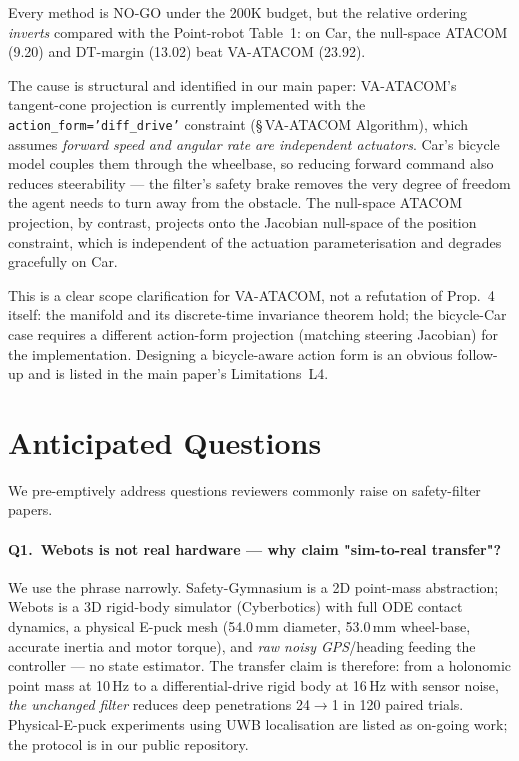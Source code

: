\documentclass[letterpaper]{article}
\begin{document}
Every method is NO-GO under the 200K budget, but the relative ordering \emph{inverts} compared with the Point-robot Table~1: on Car, the null-space ATACOM (9.20) and DT-margin (13.02) beat VA-ATACOM (23.92).

The cause is structural and identified in our main paper: VA-ATACOM's tangent-cone projection is currently implemented with the \texttt{action\_form='diff\_drive'} constraint (\S\,VA-ATACOM Algorithm), which assumes \emph{forward speed and angular rate are independent actuators}. Car's bicycle model couples them through the wheelbase, so reducing forward command also reduces steerability --- the filter's safety brake removes the very degree of freedom the agent needs to turn away from the obstacle. The null-space ATACOM projection, by contrast, projects onto the Jacobian null-space of the position constraint, which is independent of the actuation parameterisation and degrades gracefully on Car.

This is a clear scope clarification for VA-ATACOM, not a refutation of Prop.~4 itself: the manifold and its discrete-time invariance theorem hold; the bicycle-Car case requires a different action-form projection (matching steering Jacobian) for the implementation. Designing a bicycle-aware action form is an obvious follow-up and is listed in the main paper's Limitations~L4.

\section{Anticipated Questions}
\label{sec:faq}

We pre-emptively address questions reviewers commonly raise on safety-filter papers.

\paragraph{Q1.\ Webots is not real hardware --- why claim "sim-to-real transfer"?}
We use the phrase narrowly. Safety-Gymnasium is a 2D point-mass abstraction; Webots is a 3D rigid-body simulator (Cyberbotics) with full ODE contact dynamics, a physical E-puck mesh (54.0\,mm diameter, 53.0\,mm wheel-base, accurate inertia and motor torque), and \emph{raw noisy GPS}/heading feeding the controller --- no state estimator. The transfer claim is therefore: from a holonomic point mass at 10\,Hz to a differential-drive rigid body at 16\,Hz with sensor noise, \emph{the unchanged filter} reduces deep penetrations 24$\rightarrow$1 in 120 paired trials. Physical-E-puck experiments using UWB localisation are listed as on-going work; the protocol is in our public repository.
\end{document}
